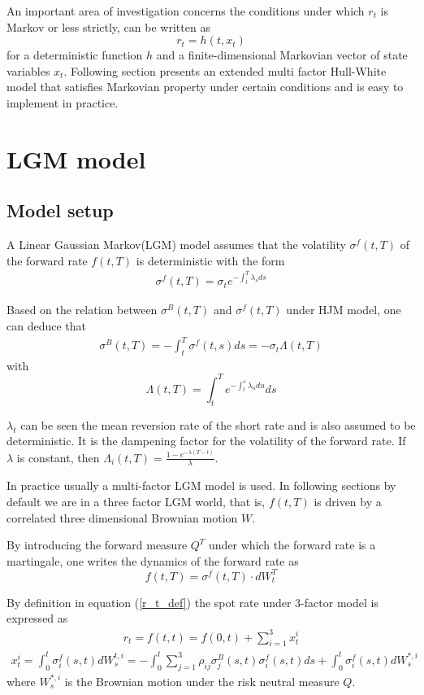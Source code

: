 \documentclass[10pt]{article}
\theoremstyle{plain}
\numberwithin{equation}{section}
\numberwithin{table}{section}
\begin{document}
An important area of investigation concerns the conditions under which $%
r_{t} $ is Markov or less strictly, can be written as
\[
    r_{t} = h(t, x_{t})
\]
for a deterministic function $h$ and a finite-dimensional Markovian vector
of state variables $x_{t}$. Following section presents an extended multi
factor Hull-White model that satisfies Markovian property under certain
conditions and is easy to implement in practice.


\section{LGM model}


\subsection{Model setup}
A Linear Gaussian Markov(LGM) model assumes
that the volatility $\sigma^f(t,T)$ of the forward rate $f(t,T)$ is deterministic with the form
\begin{eqnarray}
    \sigma^f(t,T) = \sigma_{t} e^{-\int_{t}^T\lambda _{s}ds}
    \label{SF_def}
\end{eqnarray}

Based on the relation between $\sigma^B(t,T)$ and $\sigma^f(t,T)$ under HJM model, one can deduce that
\begin{eqnarray}
    \sigma^B(t,T) = -\int_t^T \sigma^f(t,s) ds = -\sigma_{t} \Lambda (t,T)  \label{SigmaB_def}
\end{eqnarray}
with
\[
    \Lambda (t,T)=\int_{t}^{T}e^{-\int_{t}^{s}\lambda _{u}du}ds
    \label{lamda_def}    
\]

$\lambda_{t}$ can be seen the mean reversion rate of the short rate and is
also assumed to be deterministic. It is the dampening factor for the
volatility of the forward rate. If $\lambda$ is constant, then $\Lambda_{i}
(t,T)= \frac{1-e^{-\lambda(T-t)}}{\lambda}$.

In practice usually a multi-factor LGM model is used. In following sections by default we are in 
a three factor LGM world, that is, $f(t,T)$ is driven by a correlated three dimensional Brownian motion
$W$.

By introducing the forward measure $Q^T$ under which the forward rate is a
martingale, one writes the dynamics of the forward rate as 
\[
    f(t,T)=\sigma^f(t,T)\cdot dW^T_{t}    
\]

By definition in equation (\ref{r_t_def}) the spot rate under 3-factor model
is expressed as
\begin{eqnarray}
r_{t} = f(t,t)=f(0,t)+ \sum^{3}_{i=1}x_{t}^i  \label{r_int}
\end{eqnarray}
\begin{eqnarray}
    x^i_{t} = \int_{0}^t \sigma_{i}^f(s,t)dW_{s}^{t,i} =
    -\int_{0}^t\sum_{j=1}^3\rho_{ij}\sigma_{j}^B(s,t)\sigma^f_{i}(s,t)ds+
    \int_{0}^t \sigma^f_{i}(s,t)dW_{s}^{*, i}  
    \label{x_int}
\end{eqnarray}
where $W_{s}^{*,i}$ is the Brownian motion under the risk neutral measure $Q$.
\end{document}
